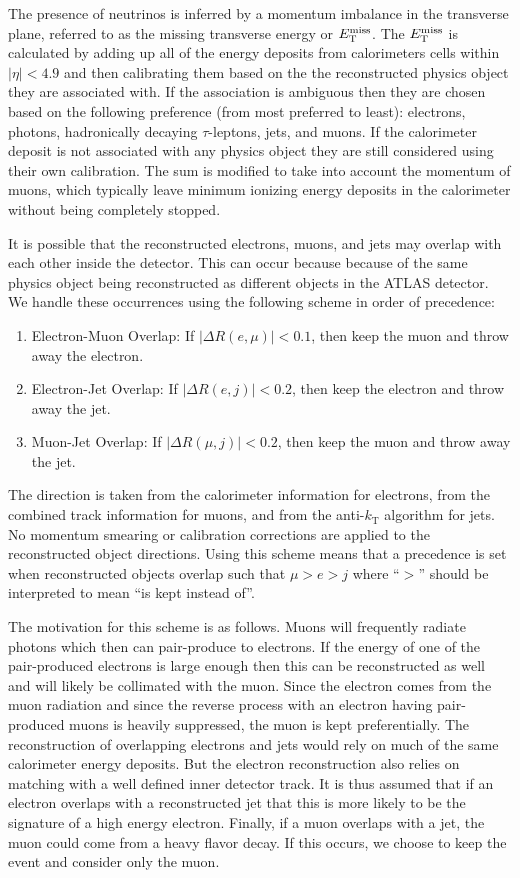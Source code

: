 The presence of neutrinos is inferred by a momentum
imbalance in the transverse plane, referred to as the missing
transverse energy or $E_{\mathrm{T}}^{\mathrm{miss}}$. The $E_{\mathrm{T}}^{\mathrm{miss}}$ is calculated by 
adding up all of 
the energy deposits from calorimeters cells within $|\eta| < 4.9$
and then calibrating them based on the the reconstructed
physics object they are associated with.
If the association is ambiguous then they are chosen based on the following
preference (from most preferred to least): electrons, photons, 
hadronically decaying $\tau$-leptons, jets, and muons.
If the calorimeter deposit is not associated with any physics object
they are still considered using their own calibration.
The sum is modified to take into account the momentum of muons,
which typically leave minimum ionizing energy deposits
in the calorimeter without being completely stopped.



It is possible that the reconstructed electrons, muons, and jets
may overlap with each other inside the detector.  This can occur
because because of the same physics object being reconstructed as different
objects in the ATLAS detector.  We handle these occurrences using the following
scheme in order of precedence:
\begin{enumerate}
	\item Electron-Muon Overlap: If $|\Delta R(e,\mu)| < 0.1$, 
	then keep the muon and throw away the electron.
	\item Electron-Jet Overlap: If $|\Delta R(e,j)| < 0.2$, 
	then keep the electron and throw away the jet.
	\item Muon-Jet Overlap: If $|\Delta R(\mu,j)| < 0.2$, 
	then keep the muon and throw away the jet.
\end{enumerate}
The direction is taken from the calorimeter information for electrons,
from the combined track information for muons, and from the anti-$k_{\mathrm{T}}$
algorithm for jets.
No momentum smearing or calibration corrections
are applied to the reconstructed object directions. 
Using this scheme means that a precedence is set when 
reconstructed objects overlap such that $\mu > e > j$ where ``$>$'' should
be interpreted to mean ``is kept instead of''. 

The motivation for this scheme
is as follows. Muons will frequently radiate photons which then can pair-produce
to electrons.  If the energy of one of the pair-produced electrons is 
large enough then this can be reconstructed as well and will likely be collimated
with the muon.  Since the electron comes from the muon radiation and
since the reverse process with an electron having pair-produced muons
is heavily suppressed, the muon is kept preferentially.  The reconstruction
of overlapping electrons and jets
would rely on much of the same calorimeter energy deposits.  But the electron
reconstruction also relies on matching with a well defined inner detector
track.  It is thus assumed that if an electron overlaps with a reconstructed
jet that this is more likely to be the signature of a high energy electron.
Finally, if a muon overlaps with a jet, the muon could come from a heavy flavor 
decay. If this occurs, we choose to keep the event and consider only the muon.


